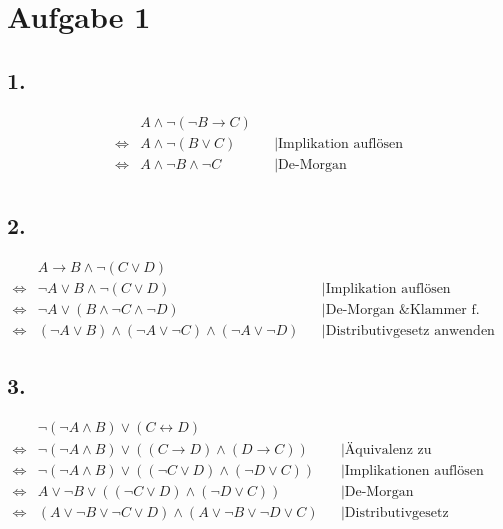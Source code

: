 \documentclass[a4paper,11pt]{article}
\begin{document}
\raggedright %

\section*{Aufgabe 1}
\subsection*{1.}
\begin{align*}
& A \land \neg (\neg B \to C) & \\
\Leftrightarrow & A \land \neg (B \lor C) && \big| \text{Implikation auflösen} \\
\Leftrightarrow & A \land \neg B \land \neg C && \big| \text{De-Morgan} \\
\end{align*}

\subsection*{2.}
\begin{align*}
& A \to B \land \neg (C \lor D) & \\
\Leftrightarrow & \neg A \lor B \land \neg (C \lor D) && \big| \text{Implikation auflösen} \\
\Leftrightarrow & \neg A \lor (B \land \neg C \land \neg D) && \big| \text{De-Morgan \& Klammer f. Sichtbarkeit setzen} \\
\Leftrightarrow & (\neg A \lor B) \land (\neg A \lor \neg C) \land (\neg A \lor \neg D) && \big| \text{Distributivgesetz anwenden}
\end{align*}

\subsection*{3.}
\begin{align*}
& \neg(\neg A \land B) \lor (C \leftrightarrow D) & \\
\Leftrightarrow & \neg(\neg A \land B) \lor ((C \to D) \land (D \to C)) && \big| \text{Äquivalenz zu Implikationen} \\
\Leftrightarrow & \neg(\neg A \land B) \lor ((\neg C \lor D) \land (\neg D \lor C)) && \big| \text{Implikationen auflösen} \\
\Leftrightarrow & A \lor \neg B \lor ((\neg C \lor D) \land (\neg D \lor C)) && \big| \text{De-Morgan} \\
\Leftrightarrow & (A \lor \neg B \lor \neg C \lor D) \land (A \lor \neg B \lor \neg D \lor C) && \big| \text{Distributivgesetz anwenden}
\end{align*}
\end{document}
